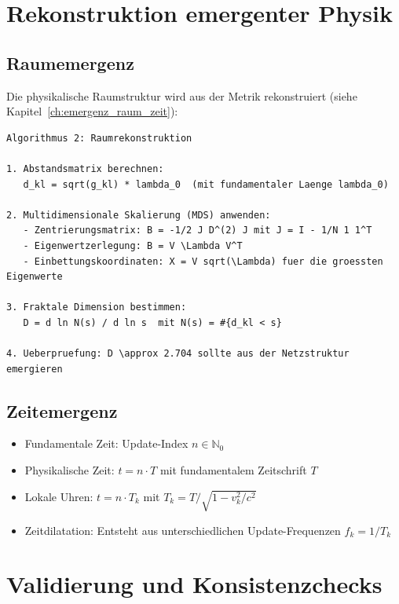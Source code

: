 \section{Rekonstruktion emergenter Physik}
\label{app:numerik_rekonstruktion}

\subsection{Raumemergenz}
\label{sub:numerik_raum}

Die physikalische Raumstruktur wird aus der Metrik rekonstruiert (siehe Kapitel~\ref{ch:emergenz_raum_zeit}):

\begin{verbatim}
Algorithmus 2: Raumrekonstruktion

1. Abstandsmatrix berechnen:
   d_kl = sqrt(g_kl) * lambda_0  (mit fundamentaler Laenge lambda_0)

2. Multidimensionale Skalierung (MDS) anwenden:
   - Zentrierungsmatrix: B = -1/2 J D^(2) J mit J = I - 1/N 1 1^T
   - Eigenwertzerlegung: B = V \Lambda V^T
   - Einbettungskoordinaten: X = V sqrt(\Lambda) fuer die groessten Eigenwerte

3. Fraktale Dimension bestimmen:
   D = d ln N(s) / d ln s  mit N(s) = #{d_kl < s}

4. Ueberpruefung: D \approx 2.704 sollte aus der Netzstruktur emergieren
\end{verbatim}

\subsection{Zeitemergenz}
\label{sub:numerik_zeit}

\begin{itemize}
    \item Fundamentale Zeit: Update-Index \( n \in \mathbb{N}_0 \)
    \item Physikalische Zeit: \( t = n \cdot T \) mit fundamentalem Zeitschrift \( T \)
    \item Lokale Uhren: \( t = n \cdot T_k \) mit \( T_k = T / \sqrt{1 - v_k^2/c^2} \)
    \item Zeitdilatation: Entsteht aus unterschiedlichen Update-Frequenzen \( f_k = 1/T_k \)
\end{itemize}

\section{Validierung und Konsistenzchecks}
\label{app:numerik_validierung}

